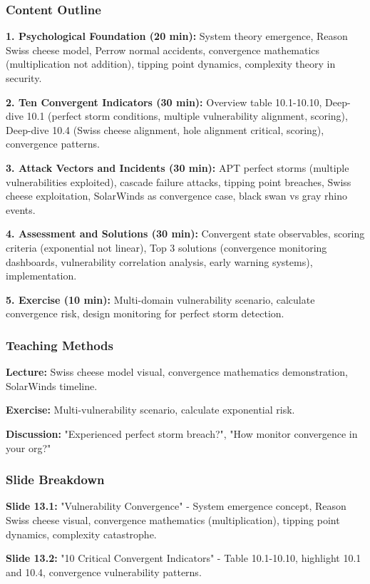 \documentclass[11pt,a4paper]{article}
\begin{document}
\subsubsection{Content Outline}
\textbf{1. Psychological Foundation (20 min):} System theory emergence, Reason Swiss cheese model, Perrow normal accidents, convergence mathematics (multiplication not addition), tipping point dynamics, complexity theory in security.

\textbf{2. Ten Convergent Indicators (30 min):} Overview table 10.1-10.10, Deep-dive 10.1 (perfect storm conditions, multiple vulnerability alignment, scoring), Deep-dive 10.4 (Swiss cheese alignment, hole alignment critical, scoring), convergence patterns.

\textbf{3. Attack Vectors and Incidents (30 min):} APT perfect storms (multiple vulnerabilities exploited), cascade failure attacks, tipping point breaches, Swiss cheese exploitation, SolarWinds as convergence case, black swan vs gray rhino events.

\textbf{4. Assessment and Solutions (30 min):} Convergent state observables, scoring criteria (exponential not linear), Top 3 solutions (convergence monitoring dashboards, vulnerability correlation analysis, early warning systems), implementation.

\textbf{5. Exercise (10 min):} Multi-domain vulnerability scenario, calculate convergence risk, design monitoring for perfect storm detection.

\subsubsection{Teaching Methods}
\textbf{Lecture:} Swiss cheese model visual, convergence mathematics demonstration, SolarWinds timeline.

\textbf{Exercise:} Multi-vulnerability scenario, calculate exponential risk.

\textbf{Discussion:} "Experienced perfect storm breach?", "How monitor convergence in your org?"

\subsubsection{Slide Breakdown}
\textbf{Slide 13.1:} "Vulnerability Convergence" - System emergence concept, Reason Swiss cheese visual, convergence mathematics (multiplication), tipping point dynamics, complexity catastrophe.

\textbf{Slide 13.2:} "10 Critical Convergent Indicators" - Table 10.1-10.10, highlight 10.1 and 10.4, convergence vulnerability patterns.
\end{document}

